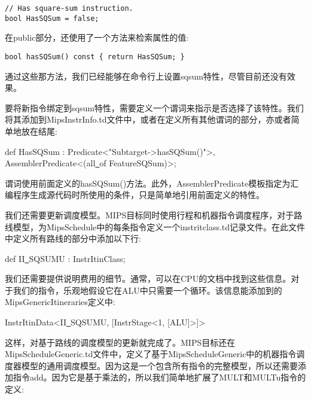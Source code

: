 \begin{lstlisting}[caption={}]
// Has square-sum instruction.
bool HasSQSum = false;
\end{lstlisting}

在public部分，还使用了一个方法来检索属性的值:\par

\begin{lstlisting}[caption={}]
bool hasSQSum() const { return HasSQSum; }
\end{lstlisting}

通过这些那方法，我们已经能够在命令行上设置sqsum特性，尽管目前还没有效果。\par

要将新指令绑定到sqsum特性，需要定义一个谓词来指示是否选择了该特性。我们将其添加到MipsInstrInfo.td文件中，或者在定义所有其他谓词的部分，亦或者简单地放在结尾:\par

\begin{tcolorbox}[colback=white,colframe=black]
def HasSQSum : Predicate<"Subtarget->hasSQSum()">, \\
\hspace*{6cm}AssemblerPredicate<(all\underline{~}of FeatureSQSum)>;
\end{tcolorbox}

谓词使用前面定义的hasSQSum()方法。此外，AssemblerPredicate模板指定为汇编程序生成源代码时所使用的条件，只是简单地引用前面定义的特性。\par

我们还需要更新调度模型。MIPS目标同时使用行程和机器指令调度程序，对于路线模型，为MipsSchedule中的每条指令定义一个instritclass.td记录文件。在此文件中定义所有路线的部分中添加以下行:\par

\begin{tcolorbox}[colback=white,colframe=black]
def II\underline{~}SQSUMU : InstrItinClass;
\end{tcolorbox}

我们还需要提供说明费用的细节。通常，可以在CPU的文档中找到这些信息。对于我们的指令，乐观地假设它在ALU中只需要一个循环。该信息能添加到的MipsGenericItineraries定义中:\par

\begin{tcolorbox}[colback=white,colframe=black]
InstrItinData<II\underline{~}SQSUMU, [InstrStage<1, [ALU]>]>
\end{tcolorbox}

这样，对基于路线的调度模型的更新就完成了。MIPS目标还在MipsScheduleGeneric.td文件中，定义了基于MipsScheduleGeneric中的机器指令调度器模型的通用调度模型。因为这是一个包含所有指令的完整模型，所以还需要添加指令add。因为它是基于乘法的，所以我们简单地扩展了MULT和MULTu指令的定义:\par

